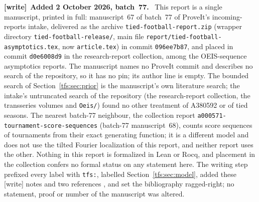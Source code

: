 \documentclass[11pt,a4paper]{article}
\numberwithin{equation}{section}
\theoremstyle{remark}
\newcommand{\1}{\mathbf 1}
\newenvironment{writenote}[1][]{\par\smallskip\begingroup\small
 \noindent\textbf{[write]}\if\relax\detokenize{#1}\relax\else~\textbf{#1.}\fi\ }%
 {\par\endgroup\smallskip}
\begin{document}
\begin{writenote}[Added 2 October 2026, batch~77]
This report is a single manuscript, printed in full: manuscript~67 of
batch~77 of ProveIt's incoming-reports intake, delivered as the archive
\texttt{tied-\allowbreak football-\allowbreak report.zip} (wrapper directory
\texttt{tied-\allowbreak football-\allowbreak release/}, main file
\texttt{report/\allowbreak tied-\allowbreak football-\allowbreak asymptotics.tex},
now \texttt{article.tex}) in commit \texttt{096ee7b87}, and placed in
commit \texttt{d0e6008d9} in the research-report collection, among the
OEIS-sequence asymptotics reports. The manuscript names no ProveIt commit
and describes no search of the repository, so it has no pin; its author
line is empty. The bounded search of Section~\ref{tfs:sec:prior} is the
manuscript's own literature search; the intake's untruncated search of the
repository (the research-report collection, the transseries volumes and
\texttt{Oeis/}) found no other treatment of A380592 or of tied seasons.
The nearest batch-77 neighbour, the collection report
\texttt{a000571-\allowbreak tournament-\allowbreak score-\allowbreak sequences}
(batch-77 manuscript~68), counts score sequences of tournaments from their
exact generating function; it is a different model and does not use the
tilted Fourier localization of this report, and neither report uses the
other. Nothing in this report is formalized in Lean
or Rocq, and placement in the collection confers no formal status on any
statement here. The writing step prefixed every label with \texttt{tfs:},
labelled Section~\ref{tfs:sec:model}, added these \textsf{[write]} notes
and two references \cite{tfs-tai,tfs-cti}, and set the bibliography
ragged-right; no statement, proof or number of the manuscript was altered.


\end{writenote}
\end{document}
